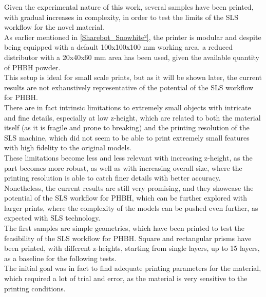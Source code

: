 \documentclass{article}
\begin{document}
        Given the experimental nature of this work, several samples have been printed, with gradual 
        increases in complexity, in order to test the limits of the SLS workflow for the novel material. \\ 

        As earlier mentioned in \ref{Sharebot_Snowhite²}, the printer is modular and despite being equipped 
        with a default 100x100x100 mm working area, a reduced distributor with a 20x40x60 mm area has been used, 
        given the available quantity of PHBH powder. \\ 

        This setup is ideal for small scale prints, but as it will be shown later, the current results 
        are not exhaustively representative of the potential of the SLS workflow for PHBH. \\

        There are in fact intrinsic limitations to extremely small objects with intricate and fine details,
        especially at low z-height, which are related to both the material itself (as it is fragile and prone to 
        breaking) and the printing resolution of the SLS machine, which 
        did not seem to be able to print extremely small features with high fidelity to the original models. \\

        These limitations become less and less relevant with increasing z-height, as the part becomes 
        more robust, as well as with increasing overall size, where the printing resolution 
        is able to catch finer details with better accuracy. \\

        Nonetheless, the current results are still very promising, and they showcase the potential of the SLS workflow
        for PHBH, which can be further explored with larger prints, where the complexity of the models 
        can be pushed even further, as expected with SLS technology. \\  

        The first samples are simple geometries, which have been printed to test the feasibility of the SLS workflow 
        for PHBH. Square and rectangular prisms have been printed, with different z-heights, starting from single 
        layers, up to 15 layers, as a baseline for the following tests. \\ 

        The initial goal was in fact to find adequate printing parameters for the material, which required a lot 
        of trial and error, as the material is very sensitive to the printing conditions. \\
\end{document}
